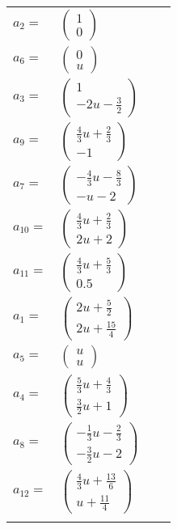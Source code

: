 \documentclass[1p]{elsarticle_modified}
\theoremstyle{definition}
\begin{document}
\begin{tabular}{m{7pt} m{180pt} m{7pt} m{180pt} }
\flushright $a_{2}=$&$\begin{pmatrix}1\\0\end{pmatrix}$ \\
\flushright $a_{6}=$&$\begin{pmatrix}0\\u\end{pmatrix}$ \\
\flushright $a_{3}=$&$\begin{pmatrix}1\\-2 u-\frac{3}{2}\end{pmatrix}$ \\
\flushright $a_{9}=$&$\begin{pmatrix}\frac{4}{3} u+\frac{2}{3}\\-1\end{pmatrix}$ \\
\flushright $a_{7}=$&$\begin{pmatrix}-\frac{4}{3} u-\frac{8}{3}\\- u-2\end{pmatrix}$ \\
\flushright $a_{10}=$&$\begin{pmatrix}\frac{4}{3} u+\frac{2}{3}\\2 u+2\end{pmatrix}$ \\
\flushright $a_{11}=$&$\begin{pmatrix}\frac{4}{3} u+\frac{5}{3}\\0.5\end{pmatrix}$ \\
\flushright $a_{1}=$&$\begin{pmatrix}2 u+\frac{5}{2}\\2 u+\frac{15}{4}\end{pmatrix}$ \\
\flushright $a_{5}=$&$\begin{pmatrix}u\\u\end{pmatrix}$ \\
\flushright $a_{4}=$&$\begin{pmatrix}\frac{5}{3} u+\frac{4}{3}\\\frac{3}{2} u+1\end{pmatrix}$ \\
\flushright $a_{8}=$&$\begin{pmatrix}-\frac{1}{3} u-\frac{2}{3}\\-\frac{3}{2} u-2\end{pmatrix}$ \\
\flushright $a_{12}=$&$\begin{pmatrix}\frac{4}{3} u+\frac{13}{6}\\u+\frac{11}{4}\end{pmatrix}$\\&\end{tabular}
\end{document}
